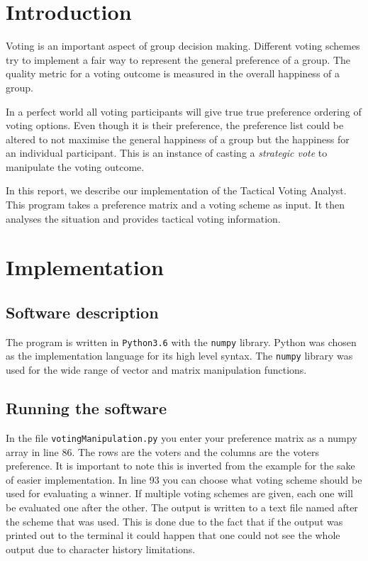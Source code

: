 \section{Introduction}
Voting is an important aspect of group decision making. Different voting schemes try to implement a fair way to represent the general preference of a group. The quality metric for a voting outcome is measured in the overall happiness of a group. 

In a perfect world all voting participants will give true true preference ordering of voting options. Even though it is their preference, the preference list could be altered to not maximise the general happiness of a group but the happiness for an individual participant. This is an instance of casting a \textit{strategic vote} to manipulate the voting outcome.

In this report, we describe our implementation of the Tactical Voting Analyst. This program takes a preference matrix and a voting scheme as input. It then analyses the situation and provides tactical voting information.

\section{Implementation}

\subsection{Software description}
The program is written in \texttt{Python3.6} with the \texttt{numpy} library. Python was chosen as the implementation language for its high level syntax. The \texttt{numpy} library was used for the wide range of vector and matrix manipulation functions.

\subsection{Running the software}
In the file \texttt{votingManipulation.py} you enter your preference matrix as a numpy array in line 86. The rows are the voters and the columns are the voters preference. It is important to note this is inverted from the example for the sake of easier implementation. In line 93 you can choose what voting scheme should be used for evaluating a winner. If multiple voting schemes are given, each one will be evaluated one after the other. The output is written to a text file named after the scheme that was used. This is done due to the fact that if the output was printed out to the terminal it could happen that one could not see the whole output due to character history limitations. 

